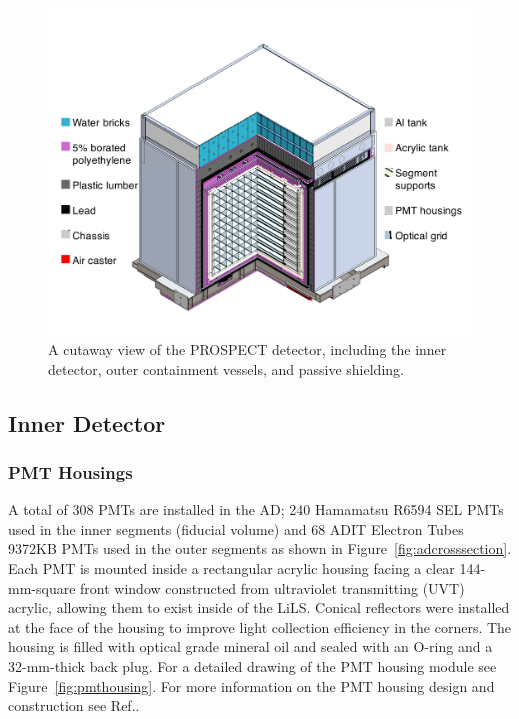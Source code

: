 \begin{figure}[t]
	\centering
	\includegraphics[width=0.8\linewidth]{tex/4-prospect-images/AD}
	\caption[Schematic of the PROSPECT detector]{A cutaway view of the PROSPECT detector, including the inner detector, outer containment vessels, and passive shielding.}
	\label{fig:ad}
\end{figure}

\subsection{Inner Detector}

\subsubsection{PMT Housings}

A total of 308 PMTs are installed in the AD; 240 Hamamatsu R6594 SEL PMTs used in the inner segments (fiducial volume) and 68 ADIT Electron Tubes 9372KB PMTs used in the outer segments as shown in Figure~\ref{fig:adcrosssection}.
Each PMT is mounted inside a rectangular acrylic housing facing a clear 144-mm-square front window constructed from ultraviolet transmitting (UVT) acrylic, allowing them to exist inside of the LiLS. 
Conical reflectors were installed at the face of the housing to improve light collection efficiency in the corners. 
The housing is filled with optical grade mineral oil and sealed with an O-ring and a 32-mm-thick back plug. 
For a detailed drawing of the PMT housing module see Figure~\ref{fig:pmthousing}.
For more information on the PMT housing design and construction see Ref.\cite{LongNIM}.

